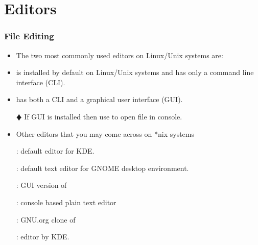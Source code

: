 \documentclass[10pt,t]{beamer}
\begin{document}
\section{Editors}
\begin{frame}
  \frametitle{\small File Editing}
  \begin{itemize}
    \item The two most commonly used editors on Linux/Unix systems are:
    \item {} is installed by default on Linux/Unix systems and has only a command line interface (CLI).
    \item {} has both a CLI and a graphical user interface (GUI).
    \item[$\vardiamond$] If  GUI is installed then use  to open file in console.
    \item Other editors that you may come across on *nix systems
    \item[] : {default editor for KDE.}
    \item[] : {default text editor for GNOME desktop environment.}
    \item[] : {GUI version of }
    \item[] : {console based plain text editor }
    \item[] : {GNU.org clone of }
    \item[] : {editor by KDE.}
  \end{itemize}
\end{frame}
\end{document}
